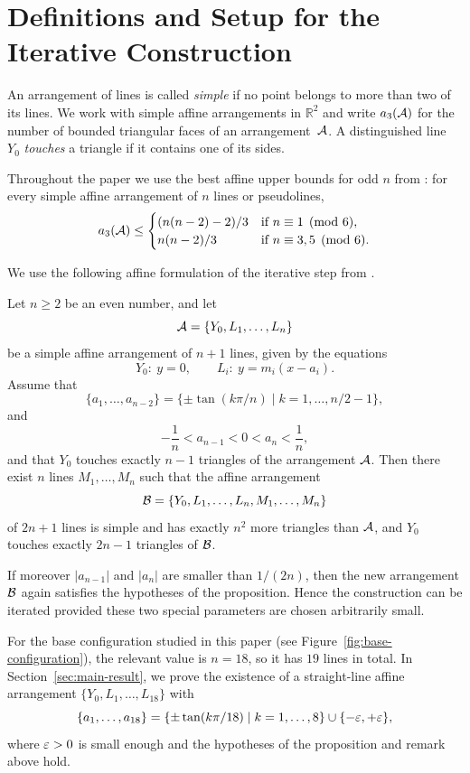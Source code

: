 \section{Definitions and Setup for the Iterative Construction}\label{sec:input-statement}

An arrangement of lines is called \emph{simple} if no point belongs to more
than two of its lines. We work with simple affine arrangements in
$\mathbb{R}^2$ and write $a_3(\mathcal{A})$ for the number of bounded triangular
faces of an arrangement~$\mathcal{A}$. A distinguished line $Y_0$ \emph{touches} a
triangle if it contains one of its sides.

Throughout the paper we use the best affine upper bounds for odd $n$
from \cite[Theorem~1]{blanc2011}: for every simple affine arrangement
of $n$ lines or pseudolines,
\begin{equation}\label{eq:upper-bound}
  a_3(\mathcal{A})\le
  \begin{cases}
    (n(n-2)-2)/3 & \text{if } n\equiv 1\pmod{6}, \\
    n(n-2)/3 & \text{if } n\equiv 3,5\pmod{6}.
  \end{cases}
\end{equation}

We use the following affine formulation of the iterative step from
\cite[Proposition~3.1 and Remark~3.2]{bartholdi2007}.

\begin{proposition}\label{prop:iterative-step}
Let $n\ge 2$ be an even number, and let
\[
  \mathcal{A}=\{Y_0,L_1,\dots,L_n\}
\]
be a simple affine arrangement of $n+1$ lines, given by the equations
\[
  Y_0:\ y=0,
  \qquad
  L_i:\ y=m_i(x-a_i).
\]
Assume that
\[
  \{a_1,\dots,a_{n-2}\}=\{\pm\tan(k\pi/n)\mid k=1,\dots,n/2-1\},
\]
and
\[
  -\frac{1}{n}<a_{n-1}<0<a_n<\frac{1}{n},
\]
and that $Y_0$ touches exactly $n-1$ triangles of the arrangement $\mathcal{A}$.
Then there exist $n$ lines $M_1,\dots,M_n$ such that
the affine arrangement
\[
  \mathcal{B}=\{Y_0,L_1,\dots,L_n,M_1,\dots,M_n\}
\]
of $2n+1$ lines is simple and has exactly $n^2$ more
triangles than $\mathcal{A}$, and $Y_0$ touches exactly $2n-1$ triangles of $\mathcal{B}$.
\end{proposition}

\begin{remark}\label{rem:iteration-condition}
If moreover $|a_{n-1}|$ and $|a_n|$ are smaller than $1/(2n)$, then the new
arrangement $\mathcal{B}$ again satisfies the hypotheses of the proposition. Hence the
construction can be iterated provided these two special parameters are chosen
arbitrarily small.
\end{remark}

For the base configuration studied in this paper
(see Figure~\ref{fig:base-configuration}), the relevant value is $n=18$,
so it has $19$ lines in total. In Section~\ref{sec:main-result},
we prove the existence of a straight-line affine arrangement
$
  \{Y_0,L_1,\dots,L_{18}\}
$
with
\[
  \{a_1,\dots,a_{18}\}=\{\pm\tan(k\pi/18)\mid k=1,\dots,8\} \cup \{-\varepsilon,+\varepsilon\},
\]
where $\varepsilon>0$ is small enough and the hypotheses of the proposition and
remark above hold.

